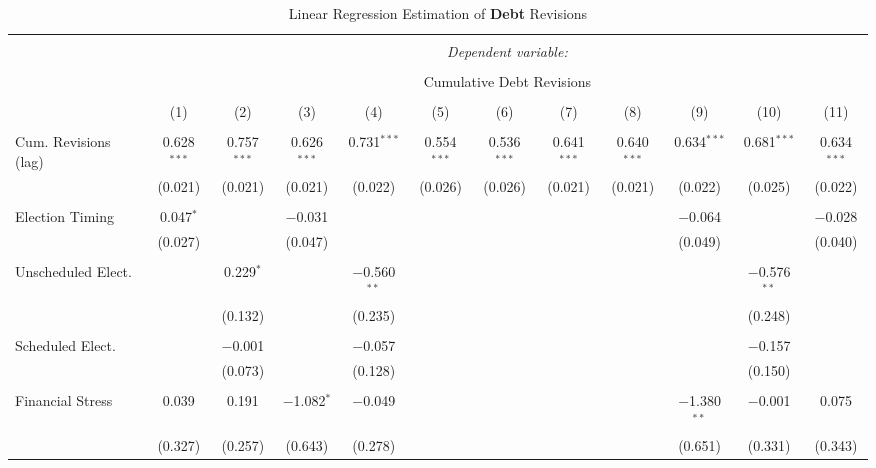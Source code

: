 
\begin{table}[!htbp] \centering 
  \caption{Linear Regression Estimation of \textbf{Debt} Revisions} 
  \label{debt_results} 
\tiny 
\begin{tabular}{@{\extracolsep{5pt}}lccccccccccc} 
\\[-1.8ex]\hline 
\hline \\[-1.8ex] 
 & \multicolumn{11}{c}{\textit{Dependent variable:}} \\ 
\cline{2-12} 
\\[-1.8ex] & \multicolumn{11}{c}{Cumulative Debt Revisions} \\ 
\\[-1.8ex] & (1) & (2) & (3) & (4) & (5) & (6) & (7) & (8) & (9) & (10) & (11)\\ 
\hline \\[-1.8ex] 
 Cum. Revisions (lag) & 0.628$^{***}$ & 0.757$^{***}$ & 0.626$^{***}$ & 0.731$^{***}$ & 0.554$^{***}$ & 0.536$^{***}$ & 0.641$^{***}$ & 0.640$^{***}$ & 0.634$^{***}$ & 0.681$^{***}$ & 0.634$^{***}$ \\ 
  & (0.021) & (0.021) & (0.021) & (0.022) & (0.026) & (0.026) & (0.021) & (0.021) & (0.022) & (0.025) & (0.022) \\ 
  & & & & & & & & & & & \\ 
 Election Timing & 0.047$^{*}$ &  & $-$0.031 &  &  &  &  &  & $-$0.064 &  & $-$0.028 \\ 
  & (0.027) &  & (0.047) &  &  &  &  &  & (0.049) &  & (0.040) \\ 
  & & & & & & & & & & & \\ 
 Unscheduled Elect. &  & 0.229$^{*}$ &  & $-$0.560$^{**}$ &  &  &  &  &  & $-$0.576$^{**}$ &  \\ 
  &  & (0.132) &  & (0.235) &  &  &  &  &  & (0.248) &  \\ 
  & & & & & & & & & & & \\ 
 Scheduled Elect. &  & $-$0.001 &  & $-$0.057 &  &  &  &  &  & $-$0.157 &  \\ 
  &  & (0.073) &  & (0.128) &  &  &  &  &  & (0.150) &  \\ 
  & & & & & & & & & & & \\ 
 Financial Stress & 0.039 & 0.191 & $-$1.082$^{*}$ & $-$0.049 &  &  &  &  & $-$1.380$^{**}$ & $-$0.001 & 0.075 \\ 
  & (0.327) & (0.257) & (0.643) & (0.278) &  &  &  &  & (0.651) & (0.331) & (0.343) \\ 

\end{tabular}
\end{table}
